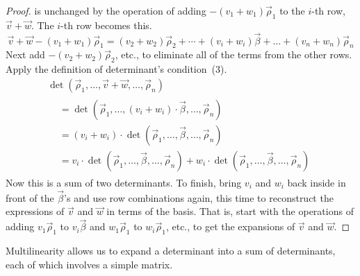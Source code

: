 \begin{proof}
is unchanged by the operation of 
adding $-(v_1+w_1)\vec{\rho}_1$ to the $i$-th row, $\vec{v}+\vec{w}$.
The $i$-th row becomes this.
\begin{equation*}
  \vec{v}+\vec{w}-(v_1+w_1)\vec{\rho}_1
  =
  (v_2+w_2)\vec{\rho}_2+\cdots+(v_i+w_i)\vec{\beta}
            +\dots+(v_n+w_n)\vec{\rho}_n 
\end{equation*}
Next add $-(v_2+w_2)\vec{\rho}_2$, etc., to eliminate 
all of the terms from the other rows.
Apply the definition of determinant's condition~(3).
\begin{multline*}
  \det (\vec{\rho}_1,\dots,\vec{v}+\vec{w},\dots,\vec{\rho}_n)          \\
  \begin{aligned}
    &=\det (\vec{\rho}_1,\dots,(v_i+w_i)\cdot\vec{\beta},\dots,\vec{\rho}_n) \\
    &=(v_i+w_i)\cdot\det (\vec{\rho}_1,\dots,\vec{\beta},\dots,\vec{\rho}_n) \\
    &=v_i\cdot \det (\vec{\rho}_1,\dots,\vec{\beta},\dots,\vec{\rho}_n)  
     +w_i\cdot \det (\vec{\rho}_1,\dots,\vec{\beta},\dots,\vec{\rho}_n)
  \end{aligned}
\end{multline*}
Now this is a sum of two determinants.
To finish, bring $v_i$ and $w_i$ back inside in front of the 
$\vec{\beta}$'s
and use row combinations again, 
this time to reconstruct the expressions of $\vec{v}$
and $\vec{w}$ in terms of the basis.
That is, start with the operations
of adding $v_1\vec{\rho}_1$ to $v_i\vec{\beta}$ 
and $w_1\vec{\rho}_1$ to $w_i\vec{\rho}_1$, etc.,
to get the expansions of $\vec{v}$ and $\vec{w}$.
\end{proof}

Multilinearity allows us to expand a determinant into a sum of
determinants, each of which involves a simple matrix.

